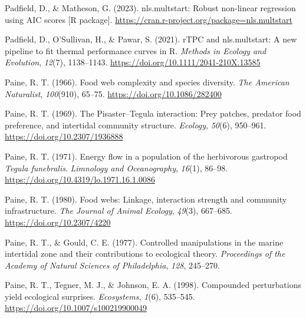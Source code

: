 \documentclass{CSUNthesis}
\begin{document}
\vspace{0.1em}

Padfield, D., \& Matheson, G. (2023). nls.multstart: Robust non-linear regression using AIC scores {[}R package{]}. \url{https://cran.r-project.org/package=nls.multstart}

\vspace{0.1em}

Padfield, D., O'Sullivan, H., \& Pawar, S. (2021). rTPC and nls.multstart: A new pipeline to fit thermal performance curves in R. \textit{Methods in Ecology and Evolution}, \textit{12}(7), 1138--1143. \url{https://doi.org/10.1111/2041-210X.13585}

\vspace{0.1em}

Paine, R. T. (1966). Food web complexity and species diversity. \textit{The American Naturalist}, \textit{100}(910), 65--75. \url{https://doi.org/10.1086/282400}

\vspace{0.1em}

Paine, R. T. (1969). The Pisaster--Tegula interaction: Prey patches, predator food preference, and intertidal community structure. \textit{Ecology}, \textit{50}(6), 950--961. \url{https://doi.org/10.2307/1936888}

\vspace{0.1em}

Paine, R. T. (1971). Energy flow in a population of the herbivorous gastropod \textit{Tegula funebralis}. \textit{Limnology and Oceanography}, \textit{16}(1), 86--98. \url{https://doi.org/10.4319/lo.1971.16.1.0086}

\vspace{0.1em}

Paine, R. T. (1980). Food webs: Linkage, interaction strength and community infrastructure. \textit{The Journal of Animal Ecology}, \textit{49}(3), 667--685. \url{https://doi.org/10.2307/4220}

\vspace{0.1em}

Paine, R. T., \& Gould, C. E. (1977). Controlled manipulations in the marine intertidal zone and their contributions to ecological theory. \textit{Proceedings of the Academy of Natural Sciences of Philadelphia}, \textit{128}, 245--270.

\vspace{0.1em}

Paine, R. T., Tegner, M. J., \& Johnson, E. A. (1998). Compounded perturbations yield ecological surprises. \textit{Ecosystems}, \textit{1}(6), 535--545. \url{https://doi.org/10.1007/s100219900049}
\end{document}
